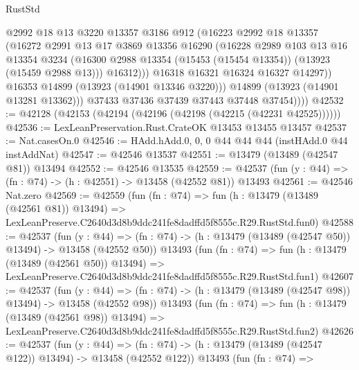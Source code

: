 \begin{lexlean}{RustStd}
\begin{coremodule}
                    @2992
                    @18
                    @13
                    @3220
                    @13357
                    @3186
                    @912
                    (@16223
                      @2992
                      @18
                      @13357
                      (@16272
                        @2991
                        @13
                        @17
                        @3869
                        @13356
                        @16290
                        (@16228
                          @2989
                          @103
                          @13
                          @16
                          @13354
                          @3234
                          (@16300 @2988 @13354 (@15453 (@15454 @13354)) (@13923 (@15459 @2988 @13)))
                          @16312)))
                    @16318
                    @16321
                    @16324
                    @16327
                    @14297))
                @16353
                @14899
                (@13923 (@14901 @13346 @3220)))
              @14899
              (@13923 (@14901 @13281 @13362)))
            @37433
            @37436
            @37439
            @37443
            @37448
            @37454))))
@42532 := @42128 (@42153 (@42194 (@42196 (@42198 (@42215 (@42231 @42525))))))
@42536 := LexLeanPreservation.Rust.CrateOK @13453 @13455 @13457
@42537 := Nat.casesOn.{0}
@42546 := HAdd.hAdd.{0, 0, 0} @44 @44 @44 (instHAdd.{0} @44 instAddNat)
@42547 := @42546 @13537
@42551 := @13479 (@13489 (@42547 @81)) @13494
@42552 := @42546 @13535
@42559 := @42537 (fun (y : @44) => (fn : @74) -> (h : @42551) -> @13458 (@42552 @81)) @13493
@42561 := @42546 Nat.zero
@42569 := @42559
    (fun (fn : @74) =>
    fun (h : @13479 (@13489 (@42561 @81)) @13494) =>
    LexLeanPreserve.C2640d3d8b9ddc241fe8dadffd5f8555c.R29.RustStd.fun0)
@42588 := @42537
    (fun (y : @44) =>
    (fn : @74) -> (h : @13479 (@13489 (@42547 @50)) @13494) -> @13458 (@42552 @50))
    @13493
    (fun (fn : @74) =>
    fun (h : @13479 (@13489 (@42561 @50)) @13494) =>
    LexLeanPreserve.C2640d3d8b9ddc241fe8dadffd5f8555c.R29.RustStd.fun1)
@42607 := @42537
    (fun (y : @44) =>
    (fn : @74) -> (h : @13479 (@13489 (@42547 @98)) @13494) -> @13458 (@42552 @98))
    @13493
    (fun (fn : @74) =>
    fun (h : @13479 (@13489 (@42561 @98)) @13494) =>
    LexLeanPreserve.C2640d3d8b9ddc241fe8dadffd5f8555c.R29.RustStd.fun2)
@42626 := @42537
    (fun (y : @44) =>
    (fn : @74) -> (h : @13479 (@13489 (@42547 @122)) @13494) -> @13458 (@42552 @122))
    @13493
    (fun (fn : @74) =>

\end{coremodule}
\end{lexlean}

